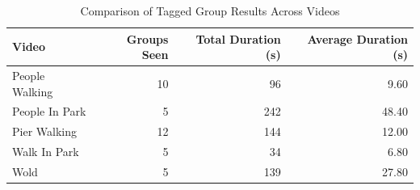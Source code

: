 \begin{table}[H]
    \centering
    \caption{Comparison of Tagged Group Results Across Videos}
    \label{tab:tagged-group-comparison}
    \begin{tabular}{l r r r}
        \toprule
        \textbf{Video} & \textbf{Groups Seen} & \textbf{Total Duration (s)} & \textbf{Average Duration (s)} \\
        \midrule
        People Walking & 10 & 96 & 9.60 \\
        People In Park & 5 & 242 & 48.40 \\
        Pier Walking & 12 & 144 & 12.00 \\
        Walk In Park & 5 & 34 & 6.80 \\
        Wold & 5 & 139 & 27.80 \\
        \bottomrule
    \end{tabular}
\end{table}
